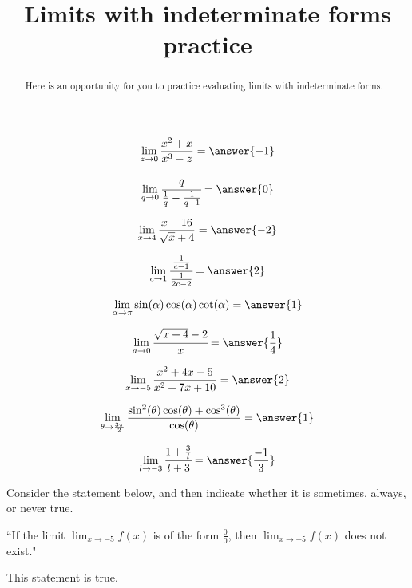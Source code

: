 \documentclass[handout]{ximera}
\title{Limits with indeterminate forms practice}
\begin{document}
\begin{abstract}
Here is an opportunity for you to practice evaluating limits with indeterminate forms. 
\end{abstract}
\maketitle

\begin{exercise}
\[\lim_{z \to 0} \frac{x^2+x}{x^3-z} = \answer{-1}\]
\end{exercise}

\begin{exercise}
\[\lim_{q \to 0} \cfrac{q}{\frac{1}{q} - \frac{1}{q-1}} = \answer{0}\]
\end{exercise}

\begin{exercise}
\[\lim_{x \to 4} \frac{x-16}{\sqrt{x} + 4} = \answer{-2}\]
\end{exercise}

\begin{exercise}
\[\lim_{c \to 1} \cfrac{\frac{1}{c-1}}{\frac{1}{2c-2}} = \answer{2}\]
\end{exercise}

\begin{exercise}
\[\lim_{\alpha \to \pi} \sin(\alpha) \cos(\alpha) \cot(\alpha) = \answer{1}\]
\end{exercise}

\begin{exercise}
\[\lim_{a \to 0} \cfrac{\sqrt{x+4} -2}{x} = \answer{\frac{1}{4}}\]
\end{exercise}

\begin{exercise}
\[\lim_{x \to -5} \frac{x^2 + 4x -5}{x^2 + 7x + 10} = \answer{2}\]
\end{exercise}

\begin{exercise}
\[\displaystyle\lim_{\theta \to \frac{3\pi}{2}} \frac{\sin^2(\theta)\cos(\theta) + \cos^3(\theta)}{\cos(\theta)} = \answer{1}\]
\end{exercise}

\begin{exercise}
\[\lim_{l \to -3} \cfrac{1+\frac{3}{l}}{l+3} = \answer{\frac{-1}{3}}\]
\end{exercise}

\begin{exercise}

Consider the statement below, and then indicate whether it is sometimes, always, or never true.

\begin{center} ``If the limit $\displaystyle\lim_{x \to -5} f(x)$ is of the form $\frac{0}{0}$, then $\displaystyle\lim_{x\to -5} f(x)$ does not exist." \end{center}

This statement is  true.

\end{exercise}
\end{document}
